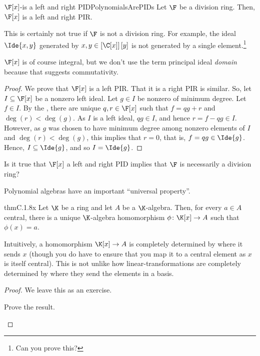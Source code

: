 \begin{prp}{$\F [x]$-is a left and right PID}{PolynomialsArePIDs}
	Let $\F$ be a division ring.  Then, $\F [x]$ is a left and right PIR.
	\begin{rmk}
		This is certainly not true if $\F$ is not a division ring.  For example, the ideal $\Ide{x,y}$ generated by $x,y\in \left[ \C [x]\right] [y]$ is not generated by a single element.\footnote{Can you prove this?}
	\end{rmk}
	\begin{rmk}
		$\F [x]$ is of course integral, but we don't use the term principal ideal \emph{domain} because that suggests commutativity.
	\end{rmk}
	\begin{proof}
		We prove that $\F [x]$ is a left PIR.  That it is a right PIR is similar.  So, let $I\subseteq \F [x]$ be a nonzero left ideal.  Let $g\in I$ be nonzero of minimum degree.  Let $f\in I$.  By the , there are unique $q,r\in \F [x]$ such that $f=qg+r$ and $\deg (r)<\deg (g)$.  As $I$ is a left ideal, $qg\in I$, and hence $r=f-qg\in I$.  However, as $g$ was chosen to have minimum degree among nonzero elements of $I$ and $\deg (r)<\deg (g)$, this implies that $r=0$, that is, $f=qg\in \Ide{g}$.  Hence, $I\subseteq \Ide{g}$, and so $I=\Ide{g}$.
	\end{proof}
\end{prp}
\begin{exr}{}{}
	Is it true that $\F [x]$ a left and right PID implies that $\F$ is necessarily a division ring?
\end{exr}

Polynomial algebras have an important ``universal property''.
\begin{thm}{}{thmC.1.8x}
	Let $\K$ be a ring and let $A$ be a $\K$-algebra.  Then, for every $a\in A$ central, there is a unique $\K$-algebra homomorphism $\phi \colon \K [x]\rightarrow A$ such that $\phi (x)=a$.
	\begin{rmk}
		Intuitively, a homomorphism $\K [x]\rightarrow A$ is completely determined by where it sends $x$ (though you do have to ensure that you map it to a central element as $x$ is itself central).  This is not unlike how linear-transformations are completely determined by where they send the elements in a basis.
	\end{rmk}
	\begin{proof}
		We leave this as an exercise.
		\begin{exr}[breakable=false]{}{}
			Prove the result.
		\end{exr}
	\end{proof}
\end{thm}

